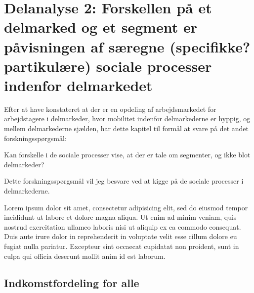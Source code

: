 




\chapter{Delanalyse 2: Forskellen på et delmarked og et segment er påvisningen af særegne (specifikke? partikulære) sociale processer indenfor delmarkedet \label{kapitel_delanalyse2_socialeprocesser}}

Efter at have konstateret at der er en opdeling af arbejdsmarkedet for arbejdstagere i delmarkeder, hvor mobilitet indenfor delmarkederne er hyppig, og mellem delmarkederne sjælden, har dette kapitel til formål at svare på det andet forskningsspørgsmål:

\begin{tcolorbox}[title=Forskningspørgsmål,
subtitle style={boxrule=0.4pt} ]
   Kan forskelle i de sociale processer vise, at der er tale om segmenter, og ikke blot delmarkeder?
\end{tcolorbox}

Dette forskningsspørgsmål vil jeg besvare ved at kigge på de sociale processer i delmarkederne.

Lorem ipsum dolor sit amet, consectetur adipisicing elit, sed do eiusmod
tempor incididunt ut labore et dolore magna aliqua. Ut enim ad minim veniam,
quis nostrud exercitation ullamco laboris nisi ut aliquip ex ea commodo
consequat. Duis aute irure dolor in reprehenderit in voluptate velit esse
cillum dolore eu fugiat nulla pariatur. Excepteur sint occaecat cupidatat non
proident, sunt in culpa qui officia deserunt mollit anim id est laborum.



\section{Indkomstfordeling for alle \label{sec_delanalyse2_loen_alle}}



